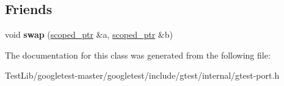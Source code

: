 \subsection*{Friends}
\begin{DoxyCompactItemize}
\item 
\mbox{\label{classtesting_1_1internal_1_1scoped__ptr_a01bc0441e6a3ebf26807ac523392ca86}} 
void {\bfseries swap} (\hyperlink{classtesting_1_1internal_1_1scoped__ptr}{scoped\+\_\+ptr} \&a, \hyperlink{classtesting_1_1internal_1_1scoped__ptr}{scoped\+\_\+ptr} \&b)
\end{DoxyCompactItemize}


The documentation for this class was generated from the following file\+:\begin{DoxyCompactItemize}
\item 
Test\+Lib/googletest-\/master/googletest/include/gtest/internal/gtest-\/port.\+h\end{DoxyCompactItemize}
